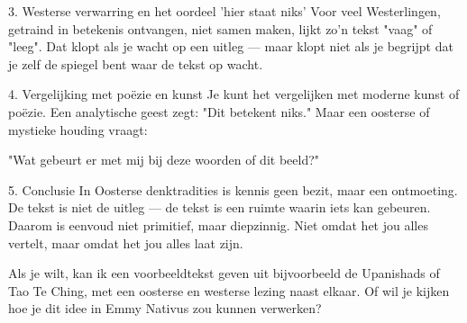 3. Westerse verwarring en het oordeel 'hier staat niks'
Voor veel Westerlingen, getraind in betekenis ontvangen, niet samen maken, lijkt zo’n tekst "vaag" of "leeg". Dat klopt als je wacht op een uitleg — maar klopt niet als je begrijpt dat je zelf de spiegel bent waar de tekst op wacht.

4. Vergelijking met poëzie en kunst
Je kunt het vergelijken met moderne kunst of poëzie. Een analytische geest zegt: "Dit betekent niks." Maar een oosterse of mystieke houding vraagt:

"Wat gebeurt er met mij bij deze woorden of dit beeld?"

5. Conclusie
In Oosterse denktradities is kennis geen bezit, maar een ontmoeting. De tekst is niet de uitleg — de tekst is een ruimte waarin iets kan gebeuren. Daarom is eenvoud niet primitief, maar diepzinnig. Niet omdat het jou alles vertelt, maar omdat het jou alles laat zijn.

Als je wilt, kan ik een voorbeeldtekst geven uit bijvoorbeeld de Upanishads of Tao Te Ching, met een oosterse en westerse lezing naast elkaar. Of wil je kijken hoe je dit idee in Emmy Nativus zou kunnen verwerken?